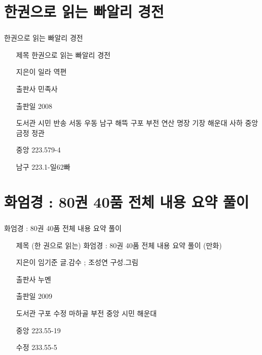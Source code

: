 \documentclass[aspectratio=1610,17pt,xcolor=pdftex,dvipsnames,table,handout]{beamer}
\begin{document}
		\section{ 한권으로 읽는 빠알리 경전 }
		\begin{frame} [t,plain]
		\frametitle{}
			\begin{block} { 한권으로 읽는 빠알리 경전 }
			\setlength{\leftmargini}{4em}			
			\begin{itemize}
				\item [제목]  	한권으로 읽는 빠알리 경전 
				\item [지은이]	일라 역편
				\item [출판사]	민족사
				\item [출판일]	2008

				\item [도서관]		시민 반송 서동 우동 남구 해뜩 구포 부전 연산 명장 기장 해운대 사하 중앙 금정 정관
				\item [중앙]		223.579-4
				\item [남구]		223.1-일62빠
			\end{itemize}
			\end{block}						
		\end{frame}						


		\section{ 화엄경 : 80권 40품 전체 내용 요약 풀이 }
		\begin{frame} [t,plain]
		\frametitle{}
			\begin{block} { 화엄경 : 80권 40품 전체 내용 요약 풀이 }
			\setlength{\leftmargini}{4em}			
			\begin{itemize}
				\item [제목]  	(한 권으로 읽는) 화엄경 : 80권 40품 전체 내용 요약 풀이 (만화) 
				\item [지은이]	임기준 글.감수 ; 조성연 구성.그림
				\item [출판사]	누멘
				\item [출판일]	2009
				\item [도서관]		구포 수정 마하골 부전 중앙 시민 해운대
				\item [중앙]		223.55-19
				\item [수정]		233.55-5
			\end{itemize}
			\end{block}						
		\end{frame}						
\end{document}
